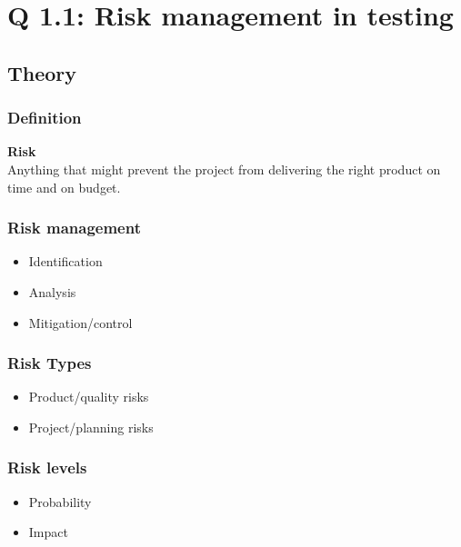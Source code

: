 

\section{Q 1.1: Risk management in testing}

\subsection{Theory}
\begin{frame}
    \frametitle{Definition}
    \textbf{Risk}\\
    Anything that might prevent the project from delivering the right product
    on time and on budget.
\end{frame}

\begin{frame}
    \frametitle{Risk management}
    \begin{itemize}
        \item Identification
        \item Analysis
        \item Mitigation/control
    \end{itemize}
\end{frame}

\begin{frame}
    \frametitle{Risk Types}
    \begin{itemize}
        \item Product/quality risks
        \item Project/planning risks
    \end{itemize}
\end{frame}

\begin{frame}
    \frametitle{Risk levels}
    \begin{itemize}
        \item Probability
        \item Impact
    \end{itemize}
\end{frame}


